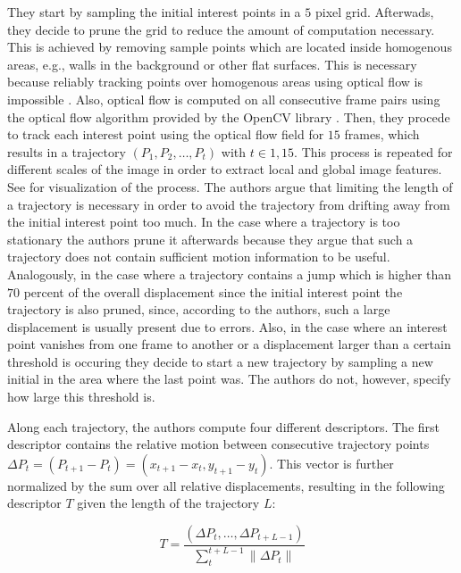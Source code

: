 They start by sampling the initial interest points in a $5$ pixel grid.
Afterwads, they decide to prune the grid to reduce the amount of computation necessary.
This is achieved by removing sample points which are located inside homogenous areas, e.g., walls in the background or other flat surfaces.
This is necessary because reliably tracking points over homogenous areas using optical flow is impossible \cite{wang_action_2013}.
Also, optical flow is computed on all consecutive frame pairs using the optical flow algorithm provided by the OpenCV library \cite{bradski_opencv_2000}.
Then, they procede to track each interest point using the optical flow field for $15$ frames, which results in a trajectory $(P_1, P_2, \dots, P_t)$ with $t \in {1, 15}$.
This process is repeated for different scales of the image in order to extract local and global image features.
See  for visualization of the process.
The authors argue that limiting the length of a trajectory is necessary in order to avoid the trajectory from drifting away from the initial interest point too much.
In the case where a trajectory is too stationary the authors prune it afterwards because they argue that such a trajectory does not contain sufficient motion information to be useful.
Analogously, in the case where a trajectory contains a jump which is higher than $70$ percent of the overall displacement since the initial interest point the trajectory is also pruned, since, according to the authors, such a large displacement is usually present due to errors.
Also, in the case where an interest point vanishes from one frame to another or a displacement larger than a certain threshold is occuring they decide to start a new trajectory by sampling a new initial in the area where the last point was.
The authors do not, however, specify how large this threshold is.

Along each trajectory, the authors compute four different descriptors.
The first descriptor contains the relative motion between consecutive trajectory points $\Delta P_t = (P_{t+1} - P_t) = (x_{t+1} - x_t, y_{t+1} - y_t)$.
This vector is further normalized by the sum over all relative displacements, resulting in the following descriptor $T$ given the length of the trajectory $L$:

\begin{equation}
    T = \frac{(\Delta P_t, \dots, \Delta P_{t + L -1})}{\sum_t^{t+L-1} \lVert \Delta P_t \rVert}
\end{equation}

